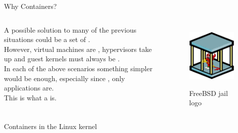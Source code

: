 \begin{frame}{Why Containers?}
\begin{columns}
  A possible solution to many of the previous situations could be a set of .\\
  However, virtual machines are , hypervisors take up  and guest kernels must always be .\\
  In each of the above scenarios something simpler would be enough, especially since , only applications are.\\
  This is what a  is.

  \begin{figure}
    \centering
    \includegraphics[scale=.7]{freebsdjail.png}
    \label{fig:jail}
    \caption{FreeBSD jail logo}
  \end{figure}
\end{columns}
\end{frame}

\begin{frame}{Containers in the Linux kernel}
\end{frame}
